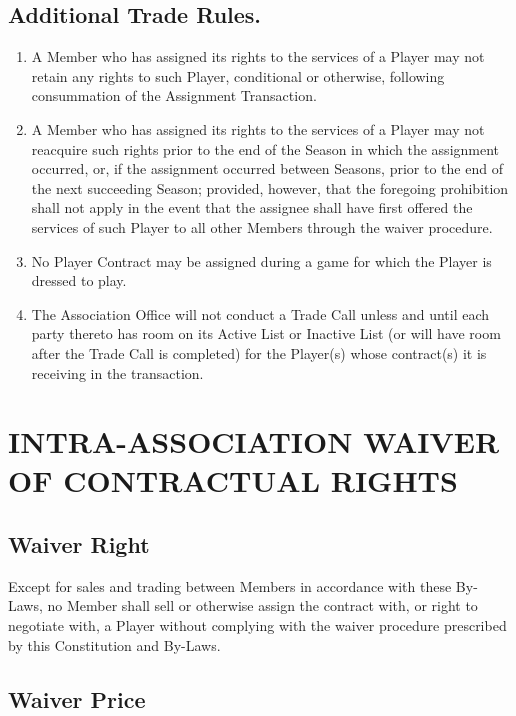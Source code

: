 \documentclass[]{book}
\providecommand{\tightlist}{%
  \setlength{\itemsep}{0pt}\setlength{\parskip}{0pt}}
\theoremstyle{definition}
\theoremstyle{definition}
\theoremstyle{definition}
\theoremstyle{remark}
\begin{document}
\subsection{Additional Trade Rules.}\label{additional-trade-rules.}

\begin{enumerate}
\def\labelenumi{(\alph{enumi})}
\tightlist
\item
  A Member who has assigned its rights to the services of a Player may
  not retain any rights to such Player, conditional or otherwise,
  following consummation of the Assignment Transaction.
\item
  A Member who has assigned its rights to the services of a Player may
  not reacquire such rights prior to the end of the Season in which the
  assignment occurred, or, if the assignment occurred between Seasons,
  prior to the end of the next succeeding Season; provided, however,
  that the foregoing prohibition shall not apply in the event that the
  assignee shall have first offered the services of such Player to all
  other Members through the waiver procedure.
\item
  No Player Contract may be assigned during a game for which the Player
  is dressed to play.
\item
  The Association Office will not conduct a Trade Call unless and until
  each party thereto has room on its Active List or Inactive List (or
  will have room after the Trade Call is completed) for the Player(s)
  whose contract(s) it is receiving in the transaction.
\end{enumerate}

\section{INTRA-ASSOCIATION WAIVER OF CONTRACTUAL
RIGHTS}\label{intra-association-waiver-of-contractual-rights}

\subsection{Waiver Right}\label{waiver-right}

Except for sales and trading between Members in accordance with these
By-Laws, no Member shall sell or otherwise assign the contract with, or
right to negotiate with, a Player without complying with the waiver
procedure prescribed by this Constitution and By-Laws.

\subsection{Waiver Price}\label{waiver-price}
\end{document}
